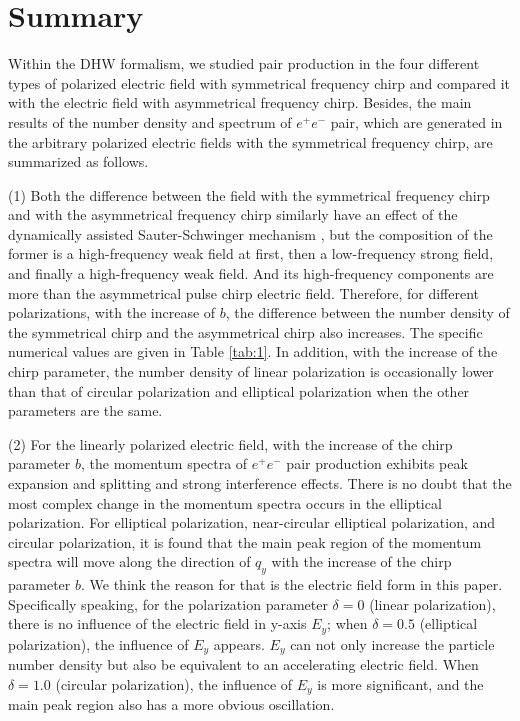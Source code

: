 \documentclass[aps,preprint,superscriptaddress]{revtex4}
\begin{document}
\section{Summary}

Within the DHW formalism, we studied pair production in the four different types of polarized electric field with symmetrical frequency chirp and compared it with the electric field with asymmetrical frequency chirp. Besides, the main results of the number density and spectrum of $e^{+}e^{-}$ pair, which are generated in the arbitrary polarized electric fields with the symmetrical frequency chirp, are summarized as follows.

(1) Both the difference between the field with the symmetrical frequency chirp and with the asymmetrical frequency chirp similarly have an effect of the dynamically assisted Sauter-Schwinger mechanism \cite{Li:2014pp,Schutzhold:2008pz,Abdukerim:2012ke}, but the composition of the former is a high-frequency weak field at first, then a low-frequency strong field, and finally a high-frequency weak field. And its high-frequency components are more than the asymmetrical pulse chirp electric field. Therefore, for different polarizations, with the increase of $b$, the difference between the number density of the symmetrical chirp and the asymmetrical chirp also increases. The specific numerical values are given in Table \ref{tab:1}. In addition, with the increase of the chirp parameter, the number density of linear polarization is occasionally lower than that of circular polarization and elliptical polarization when the other parameters are the same.

(2) For the linearly polarized electric field, with the increase of the chirp parameter $b$, the momentum spectra of $e^{+}e^{-}$ pair production exhibits peak expansion and splitting and strong interference effects. There is no doubt that the most complex change in the momentum spectra occurs in the elliptical polarization. For elliptical polarization, near-circular elliptical polarization, and circular polarization, it is found that the main peak region of the momentum spectra will move along the direction of $q_{y}$ with the increase of the chirp parameter $b$. We think the reason for that is the electric field form in this paper. Specifically speaking, for the polarization parameter $\delta=0$ (linear polarization), there is no influence of the electric field in y-axis $E_y$; when $\delta=0.5$ (elliptical polarization), the influence of $E_y$ appears. $E_y$ can not only increase the particle number density but also be equivalent to an accelerating electric field. When $\delta=1.0$ (circular polarization), the influence of $E_y$ is more significant, and the main peak region also has a more obvious oscillation.
\end{document}

